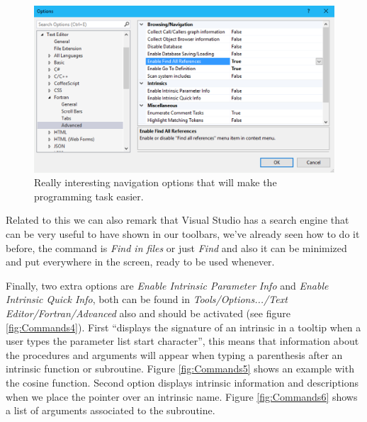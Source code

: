 \begin{itemize}
    \begin{figure}
        \centering
        \includegraphics[width= \textwidth]{Figures/Commands3}
        \caption{Really interesting navigation options that will make the programming task easier.}
        \label{fig:Commands3}
    \end{figure}

    Related to this we can also remark that Visual Studio has a search engine that can be very useful to have shown in our toolbars, we've already seen how to do it before, the command is \textit{Find in files} or just \textit{Find} and also it can be minimized and put everywhere in the screen, ready to be used whenever.
    
    Finally, two extra options are \textit{Enable Intrinsic Parameter Info} and \textit{Enable Intrinsic Quick Info}, both can be found in \textit{Tools/Options.../Text Editor/Fortran/Advanced} also and should be activated (see figure \ref{fig:Commands4}). First ``displays the signature of an intrinsic in a tooltip when a user types the parameter list start character'', this means that information about the procedures and arguments will appear when typing a parenthesis after an intrinsic function or subroutine. Figure \ref{fig:Commands5} shows an example with the cosine function. Second option displays intrinsic information and descriptions when we place the pointer over an intrinsic name. Figure \ref{fig:Commands6} shows a list of arguments associated to the subroutine.
    

\end{itemize}
